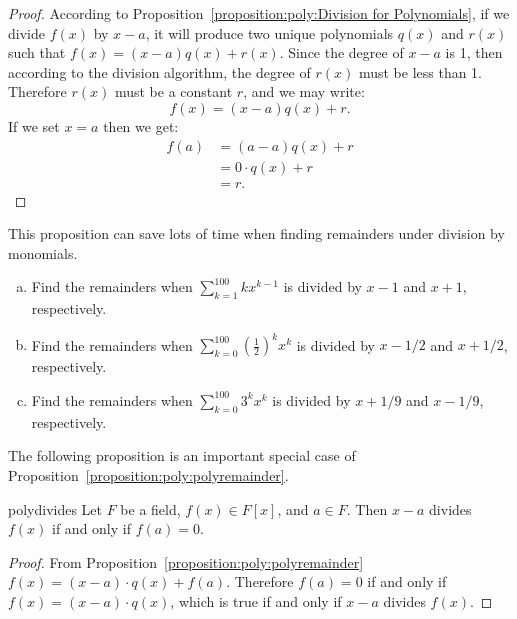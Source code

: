\begin{proof}
According to Proposition~\ref{proposition:poly:Division for Polynomials}, if we divide $f(x)$ by $x-a$, it will produce two unique polynomials $q(x)$ and $r(x)$ such that $f(x) = (x-a)q(x) + r(x)$.  Since the degree of $x-a$ is 1, then according to the division algorithm, the degree of $r(x)$ must be less than 1.  Therefore $r(x)$ must be a constant $r$, and we may write:
\[f(x) = (x-a)q(x) + r.\]
If we set $x=a$ then we get:
\begin{align*}
f(a) &= (a-a)q(x) + r\\
& = 0 \cdot q(x) + r \\
& = r.
\end{align*}
\end {proof}

This proposition can save lots of time when finding remainders under division by monomials.

\begin{exercise}{}
\begin{enumerate}[(a)]
\item
Find the remainders when $\sum_{k=1}^{100} k x^{k-1}$ is divided by $x-1$ and  $x+1$, respectively.
\item
Find the remainders when $\sum_{k=0}^{100} \left( \frac{1}{2} \right)^k x^k$ is divided by $x-1/2$ and $x+1/2$, respectively.
\item
Find the remainders when $\sum_{k=0}^{100} 3^k x^{k}$ is divided by $x+1/9$ and $x - 1/9$, respectively.
\end{enumerate}
\end{exercise}

The following proposition is an important special case of Proposition~\ref{proposition:poly:polyremainder}.

\begin{prop}{polydivides}
Let $F$ be a field, $f(x) \in F[x]$, and $a \in F$.  Then $x-a$ divides $f(x)$ if and only if $f(a) = 0$.
\end {prop}

\begin{proof}
From Proposition~\ref{proposition:poly:polyremainder} $f(x) = (x-a) \cdot q(x) + f(a)$. Therefore $f(a) = 0$ if and only if $f(x)=(x-a) \cdot q(x)$, which is true if and only if $x-a$ divides $f(x)$.
\end{proof}

